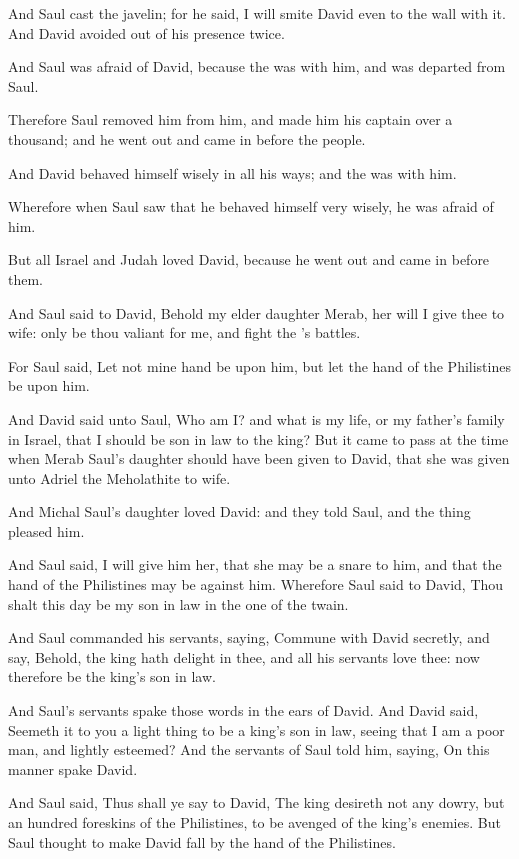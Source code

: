 \verse And Saul cast the javelin; for he said, I will smite David even to the wall with it. And David avoided out of his presence twice.

\verse And Saul was afraid of David, because the \LORD was with him, and was departed from Saul.

\verse Therefore Saul removed him from him, and made him his captain over a thousand; and he went out and came in before the people.

\verse And David behaved himself wisely in all his ways; and the \LORD was with him.

\verse Wherefore when Saul saw that he behaved himself very wisely, he was afraid of him.

\verse But all Israel and Judah loved David, because he went out and came in before them.

\verse And Saul said to David, Behold my elder daughter Merab, her will I give thee to wife: only be thou valiant for me, and fight the \LORD's battles.

For Saul said, Let not mine hand be upon him, but let the hand of the Philistines be upon him.

\verse And David said unto Saul, Who am I? and what is my life, or my father's family in Israel, that I should be son in law to the king?  \verse But it came to pass at the time when Merab Saul's daughter should have been given to David, that she was given unto Adriel the Meholathite to wife.

\verse And Michal Saul's daughter loved David: and they told Saul, and the thing pleased him.

\verse And Saul said, I will give him her, that she may be a snare to him, and that the hand of the Philistines may be against him.  Wherefore Saul said to David, Thou shalt this day be my son in law in the one of the twain.

\verse And Saul commanded his servants, saying, Commune with David secretly, and say, Behold, the king hath delight in thee, and all his servants love thee: now therefore be the king's son in law.

\verse And Saul's servants spake those words in the ears of David. And David said, Seemeth it to you a light thing to be a king's son in law, seeing that I am a poor man, and lightly esteemed?  \verse And the servants of Saul told him, saying, On this manner spake David.

\verse And Saul said, Thus shall ye say to David, The king desireth not any dowry, but an hundred foreskins of the Philistines, to be avenged of the king's enemies. But Saul thought to make David fall by the hand of the Philistines.

